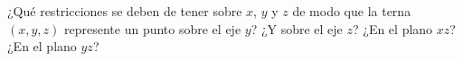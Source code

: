 ¿Qué restricciones se deben de tener sobre $x$, $y$ y $z$ de modo que la terna $(x,y,z)$ represente un punto sobre el eje $y$? ¿Y sobre el eje $z$? ¿En el plano $xz$? ¿En el plano $yz$?